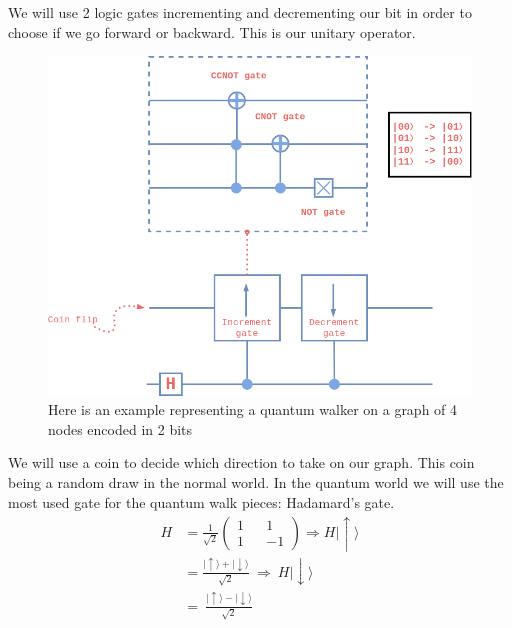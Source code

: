 \documentclass[9pt,journal,compsoc]{IEEEtran}
\begin{document}
            We will use 2 logic gates incrementing and decrementing our bit in order to choose if we go forward or backward. This is our unitary operator.
            \begin{figure}[htp!]
                \centering
                \includegraphics[width=\linewidth]{assets/img/schema2.png}
                \caption{Here is an example representing a quantum walker on a graph of 4 nodes encoded in 2 bits}
                \label{fig:opposing}
            \end{figure}
            
            We will use a coin to decide which direction to take on our graph. This coin being a random draw in the normal world.
            In the quantum world we will use the most used gate for the quantum walk pieces: Hadamard's gate.
            \begin{equation*}
            \begin{split}
                H & = \frac{1}{\sqrt{2}}\begin{pmatrix} 1 && 1 \\ 1 && -1 \end{pmatrix} \Rightarrow  H \lvert  \uparrow\rangle
                \\
                &= \frac{\lvert\uparrow\rangle  + \lvert  \downarrow\rangle }{\sqrt{2}} \ \Rightarrow \ H \lvert  \downarrow\rangle
                \\
                &= \ \frac{\lvert  \uparrow\rangle  - \lvert  \downarrow\rangle }{\sqrt{2}}
            \end{split}
            \end{equation*}
\end{document}
